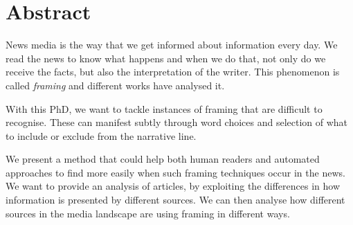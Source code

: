 \chapter*{Abstract}

News media is the way that we get informed about information every day.
We read the news to know what happens and when we do that, not only do we receive the facts, but also the interpretation of the writer.
This phenomenon is called \emph{framing} and different works have analysed it.

With this PhD, we want to tackle instances of framing that are difficult to recognise.
These can manifest subtly through word choices and selection of what to include or exclude from the narrative line.

We present a method that could help both human readers and automated approaches to find more easily when such framing techniques occur in the news.
We want to provide an analysis of articles, by exploiting the differences in how information is presented by different sources.
We can then analyse how different sources in the media landscape are using framing in different ways.  
